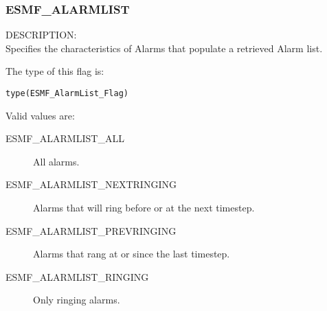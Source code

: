 
\subsubsection{ESMF\_ALARMLIST}
\label{const:alarmlist}

{\sf DESCRIPTION:\\}
Specifies the characteristics of Alarms that populate
a retrieved Alarm list.

The type of this flag is:

{\tt type(ESMF\_AlarmList\_Flag)}

Valid values are:
\begin{description}

\item [ESMF\_ALARMLIST\_ALL] 
      All alarms.

\item [ESMF\_ALARMLIST\_NEXTRINGING] 
      Alarms that will ring before or at the next timestep.

\item [ESMF\_ALARMLIST\_PREVRINGING] 
      Alarms that rang at or since the last timestep.

\item [ESMF\_ALARMLIST\_RINGING] 
      Only ringing alarms.

\end{description}

